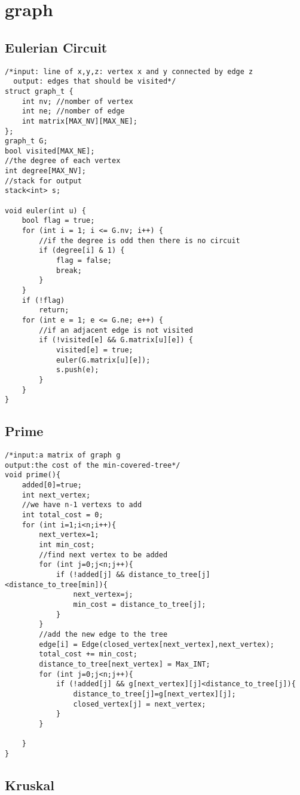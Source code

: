 \section{graph}
\subsection{Eulerian Circuit}
\begin{lstlisting}
/*input: line of x,y,z: vertex x and y connected by edge z
  output: edges that should be visited*/
struct graph_t {
    int nv; //nomber of vertex
    int ne; //nomber of edge
    int matrix[MAX_NV][MAX_NE];
};
graph_t G;
bool visited[MAX_NE];
//the degree of each vertex
int degree[MAX_NV];    
//stack for output
stack<int> s;

void euler(int u) {
    bool flag = true;
    for (int i = 1; i <= G.nv; i++) {
        //if the degree is odd then there is no circuit
        if (degree[i] & 1) {
            flag = false;
            break;
        }
    }
    if (!flag)
    	return;    
    for (int e = 1; e <= G.ne; e++) {
    	//if an adjacent edge is not visited
        if (!visited[e] && G.matrix[u][e]) {
            visited[e] = true;
            euler(G.matrix[u][e]);
            s.push(e);
        }
    }
}
\end{lstlisting}
\subsection{Prime}
\begin{lstlisting}
/*input:a matrix of graph g
output:the cost of the min-covered-tree*/
void prime(){
    added[0]=true;
    int next_vertex;
    //we have n-1 vertexs to add
    int total_cost = 0;
    for (int i=1;i<n;i++){
        next_vertex=1;
        int min_cost;
        //find next vertex to be added
        for (int j=0;j<n;j++){
            if (!added[j] && distance_to_tree[j]<distance_to_tree[min]){
                next_vertex=j;
                min_cost = distance_to_tree[j];
            }
        }
        //add the new edge to the tree
        edge[i] = Edge(closed_vertex[next_vertex],next_vertex);
        total_cost += min_cost; 
        distance_to_tree[next_vertex] = Max_INT;
        for (int j=0;j<n;j++){
            if (!added[j] && g[next_vertex][j]<distance_to_tree[j]){
                distance_to_tree[j]=g[next_vertex][j];
                closed_vertex[j] = next_vertex;
            }
        }

    }
}
\end{lstlisting}
\subsection{Kruskal}
